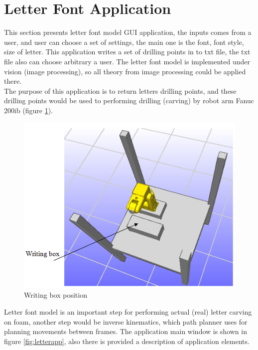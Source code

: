 \section{Letter Font Application}
\label{sec:font}
This section presents letter font model GUI application, the inputs comes from a user, and user can choose a set of settings, the main one is the font, font style, size of letter. This application writes a set of drilling points in to txt file, the txt file also can choose arbitrary a user. The letter font model is implemented under vision (image processing), so all theory from image processing could be applied there.\\
The purpose of this application is to return letters drilling points, and these drilling points would be used to performing drilling (carving) by robot arm Fanuc 200ib (figure \ref{fig:writingbox}).

\begin{figure}[H]
  \centering
  \includegraphics[scale= 1]{source/writingbox.png}
  \caption{Writing box position}
  \label{fig:writingbox}
\end{figure}

Letter font model is an important step for performing actual (real) letter carving on foam, another step would be inverse kinematics, which path planner uses for planning movements between frames. The application main window is shown in figure  \ref{fig:letterapp}, also there is provided a description of application elements.

